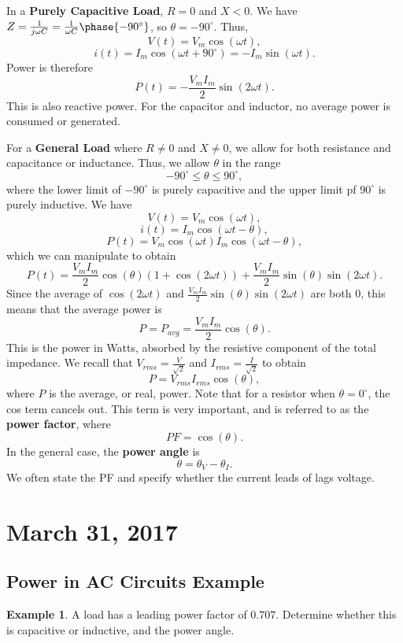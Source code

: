 \documentclass[11pt]{article}
\theoremstyle{plain} %
\theoremstyle{definition}
\theoremstyle{example}
\newtheorem*{example}{Example}
\theoremstyle{remark}
\newcommand{\degree}{^{\circ}}
\begin{document}
In a \textbf{Purely Capacitive Load}, $R=0$ and $X<0$.
We have $Z = \frac{1}{j\omega C} = \frac{1}{\omega C}\phase{-90\degree}$, so $\theta = -90\degree$. Thus, 
$$V(t) = V_m\cos(\omega t),$$
$$i(t) = I_m\cos(\omega t +90\degree) = -I_m\sin(\omega t).$$
Power is therefore 
$$P(t) = -\frac{V_mI_m}{2}\sin(2\omega t).$$
This is also reactive power. For the capacitor and inductor, no average power is consumed or generated. 

For a \textbf{General Load} where $R\neq 0$ and $X\neq 0$, we allow for both resistance and capacitance or inductance. Thus, we allow $\theta$ in the range 
$$-90 \degree \leq \theta \leq 90 \degree,$$
where the lower limit of $-90\degree$ is purely capacitive and the upper limit pf $90 \degree$ is purely inductive. We have 
$$V(t) = V_m\cos(\omega t),$$
$$i(t) = I_m\cos(\omega t -\theta),$$
$$P(t) = V_m\cos(\omega t)I_m\cos(\omega t - \theta),$$
which we can manipulate to obtain 
$$P(t) = \frac{V_mI_m}{2}\cos(\theta)\left(1+\cos(2\omega t)\right) + \frac{V_mI_m}{2}\sin(\theta)\sin(2\omega t).$$
Since the average of $\cos(2\omega t)$ and $\frac{V_mI_m}{2}\sin(\theta)\sin(2\omega t)$ are both $0$, this means that the average power is 
$$P = P_{avg} = \frac{V_mI_m}{2}\cos(\theta).$$
This is the power in Watts, absorbed by the resistive component of the total impedance. We recall that $V_{rms} = \frac{V}{\sqrt 2}$ and $I_{rms} = \frac{I}{\sqrt 2}$ to obtain 
$$P = V_{rms}I_{rms}\cos(\theta),$$
where $P$ is the average, or real, power. 
Note that for a resistor when $\theta = 0\degree$, the cos term cancels out. This term is very important, and is referred to as the \textbf{power factor}, where 
$$PF = \cos(\theta).$$
In the general case, the \textbf{power angle} is 
$$\theta = \theta_V-\theta_I.$$
We often state the PF and specify whether the current leads of lags voltage. 

\section{March 31, 2017}
\subsection{Power in AC Circuits Example}

\begin{example}
A load has a leading power factor of $0.707$. Determine whether this is capacitive or inductive, and the power angle. 
\end{example}
\end{document}
